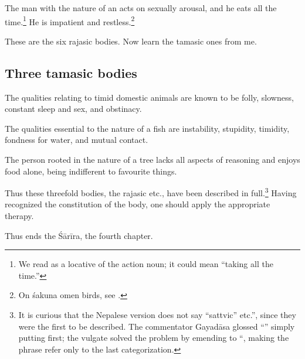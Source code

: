 \begin{translation}
The man with the nature of an  
acts on sexually arousal, and he eats all the time.\footnote{We read
     as a locative of the action noun; it could mean “taking all the time.”}  He is impatient and restless.\footnote{On śakuna omen birds, see
        \cite[6--8]{zysk-2025}.}
        
\item[94cd]
        
These are the six rajasic bodies.  Now learn the tamasic ones from me.
      

\subsection{Three tamasic bodies}

\item[95]

The qualities relating to timid domestic animals are known to be
folly, slowness, constant sleep and sex, and obstinacy.


\item[96]

The qualities essential to the nature of a fish are
instability, stupidity, timidity, fondness for water, and mutual
contact.

\item[97]

The person rooted in the nature of a tree lacks all aspects of
reasoning and enjoys food alone, being indifferent to  
favourite things.

\item[98]

Thus these threefold bodies, the rajasic etc., have been described in
full.\footnote{It is curious that the Nepalese version does not say
    “sattvic” etc.”, since they were the first to be described.  The
    commentator Gayadāsa glossed “” simply
    putting  first; the vulgate solved the problem by emending
    to “, making the phrase refer only to the last
    categorization.} Having recognized the constitution of the body, one
    should apply the appropriate therapy.

\bigskip

\item[99]

Thus ends the Śārīra, the fourth chapter.


\end{translation}
